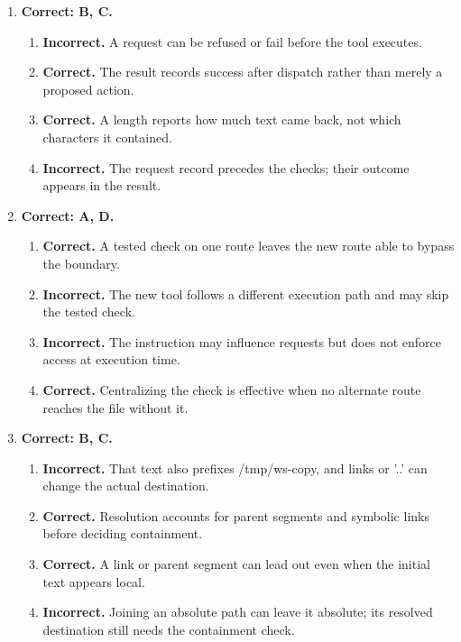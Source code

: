 \begin{enumerate}[start=31,itemsep=0.7\baselineskip]
\item[{\hyperref[exercise:37]{37.}}] \begin{minipage}[t]{\linewidth}
\textbf{Correct: B, C.}
\begin{enumerate}[label=\textnormal{(\Alph*)},leftmargin=*,itemsep=0pt]
\item \textbf{Incorrect.} A request can be refused or fail before the tool executes.
\item \textbf{Correct.} The result records success after dispatch rather than merely a proposed action.
\item \textbf{Correct.} A length reports how much text came back, not which characters it contained.
\item \textbf{Incorrect.} The request record precedes the checks; their outcome appears in the result.
\end{enumerate}
\end{minipage}

\item[{\hyperref[exercise:38]{38.}}] \begin{minipage}[t]{\linewidth}
\textbf{Correct: A, D.}
\begin{enumerate}[label=\textnormal{(\Alph*)},leftmargin=*,itemsep=0pt]
\item \textbf{Correct.} A tested check on one route leaves the new route able to bypass the boundary.
\item \textbf{Incorrect.} The new tool follows a different execution path and may skip the tested check.
\item \textbf{Incorrect.} The instruction may influence requests but does not enforce access at execution time.
\item \textbf{Correct.} Centralizing the check is effective when no alternate route reaches the file without it.
\end{enumerate}
\end{minipage}

\item[{\hyperref[exercise:39]{39.}}] \begin{minipage}[t]{\linewidth}
\textbf{Correct: B, C.}
\begin{enumerate}[label=\textnormal{(\Alph*)},leftmargin=*,itemsep=0pt]
\item \textbf{Incorrect.} That text also prefixes /tmp/ws-copy, and links or '..' can change the actual destination.
\item \textbf{Correct.} Resolution accounts for parent segments and symbolic links before deciding containment.
\item \textbf{Correct.} A link or parent segment can lead out even when the initial text appears local.
\item \textbf{Incorrect.} Joining an absolute path can leave it absolute; its resolved destination still needs the containment check.
\end{enumerate}
\end{minipage}


\end{enumerate}
